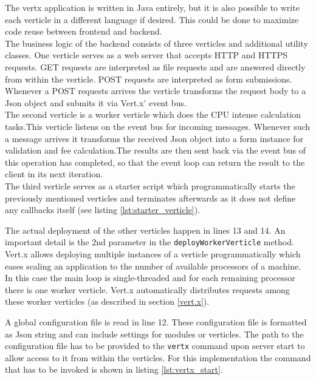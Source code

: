 The vertx application is written in Java entirely, but it is also possible to
write each verticle in a different language if desired. This could be done to
maximize code reuse between frontend and backend.\\
The business logic of the backend consists of three verticles and additional
utility classes.
One verticle serves as a web server that accepts HTTP and HTTPS requests. GET
requests are interpreted as file requests and are answered directly from within
the verticle. POST requests are interpreted as form submissions. Whenever a POST
requests arrives the verticle transforms the request body to a Json object and
submits it via Vert.x' event bus.\\
The second verticle is a worker verticle which does the CPU intense calculation
tasks.This verticle listens on the event bus for incoming messages. Whenever
such a message arrives it transforms the received Json object into a form
instance for validation and fee calculation.The results are then sent back via
the event bus of this operation has completed, so that the event loop can return
the result to the client in its next iteration.\\
The third verticle serves as a starter script which programmatically starts
the previously mentioned verticles and terminates afterwards as it does not
define any callbacks itself (see listing \ref{lst:starter_verticle}).



The actual deployment of the other verticles happen in lines 13 and 14.
An important detail is the 2nd parameter in the \texttt{deployWorkerVerticle} method.
Vert.x allows deploying multiple instances of a verticle programmatically
which eases scaling an application to the number of available processors of a machine.
In this case the main loop is single-threaded and for each remaining processor
there is one worker verticle. Vert.x automatically distributes requests among
these worker verticles (as described in section \ref{vert.x}).

A global configuration file is read in line 12. These configuration file is
formatted as Json string and can include settings for modules or verticles. The
path to the configuration file has to be provided to the \texttt{vertx} command
upon server start to allow access to it from within the verticles. For this implementation the command that
has to be invoked is shown in listing \ref{lst:vertx_start}.

